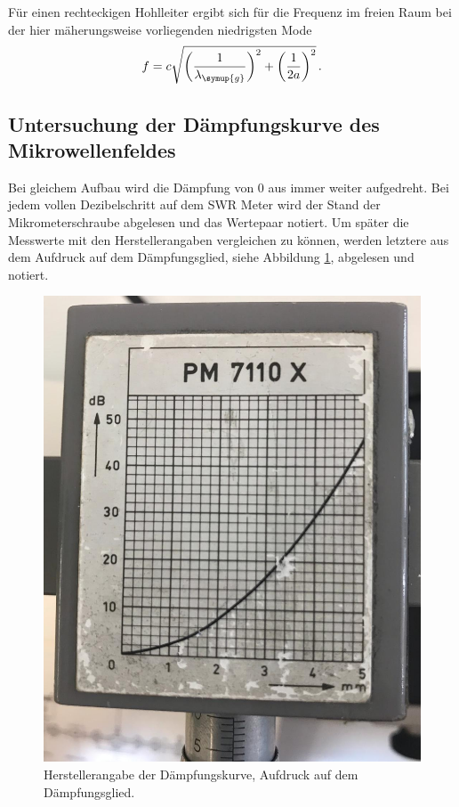 Für einen rechteckigen Hohlleiter ergibt sich für die Frequenz im freien Raum
bei der hier mäherungsweise vorliegenden niedrigsten Mode
\begin{equation}
  f=c \sqrt{\left(\frac{1}{\lambda_{\symup{g}}}\right)^2+\left(\frac{1}{2a}\right)^2} \,.
\end{equation}

\subsection{Untersuchung der Dämpfungskurve des Mikrowellenfeldes}
\label{subsec:dämpfung}
Bei gleichem Aufbau wird die Dämpfung von 0 aus immer weiter aufgedreht. Bei jedem
vollen Dezibelschritt auf dem SWR Meter wird der Stand der Mikrometerschraube
abgelesen und das Wertepaar notiert. Um später die Messwerte mit den Herstellerangaben vergleichen zu können, werden letztere aus dem Aufdruck auf dem Dämpfungsglied, siehe Abbildung \ref{fig:aufdruckDaempfung}, abgelesen und notiert.

\begin{figure}
  \centering
  \includegraphics[width=\textwidth]{data/theorieDaempfung.png}
  \caption{Herstellerangabe der Dämpfungskurve, Aufdruck auf dem Dämpfungsglied.}
  \label{fig:aufdruckDaempfung}
\end{figure}

